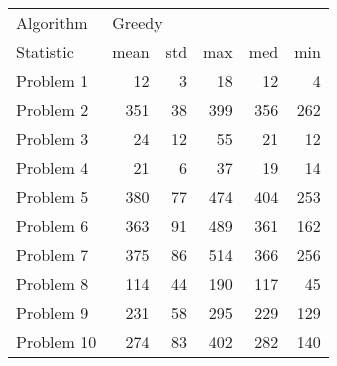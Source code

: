 \begin{tabular}{lrrrrr}
\toprule
Algorithm & \multicolumn{5}{l}{Greedy} \\
Statistic &   mean & std &  max &  med &  min \\
\midrule
Problem 1  &     12 &   3 &   18 &   12 &    4 \\
Problem 2  &    351 &  38 &  399 &  356 &  262 \\
Problem 3  &     24 &  12 &   55 &   21 &   12 \\
Problem 4  &     21 &   6 &   37 &   19 &   14 \\
Problem 5  &    380 &  77 &  474 &  404 &  253 \\
Problem 6  &    363 &  91 &  489 &  361 &  162 \\
Problem 7  &    375 &  86 &  514 &  366 &  256 \\
Problem 8  &    114 &  44 &  190 &  117 &   45 \\
Problem 9  &    231 &  58 &  295 &  229 &  129 \\
Problem 10 &    274 &  83 &  402 &  282 &  140 \\
\bottomrule
\end{tabular}
